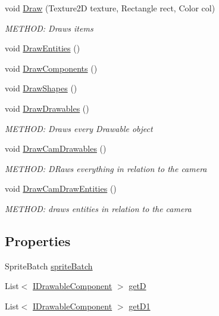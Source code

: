 \begin{DoxyCompactItemize}
void \hyperlink{a00526_a5e7f7ef9bf468db27267ee1e50a34af3}{Draw} (Texture2D texture, Rectangle rect, Color col)
\begin{DoxyCompactList}\small\item\em M\+E\+T\+H\+OD\+: Draws items \end{DoxyCompactList}\item 
void \hyperlink{a00526_a9eb548f058744b031b639810a16ba40d}{Draw\+Entities} ()
\item 
void \hyperlink{a00526_a0df839a3a677b7595e4535716e823809}{Draw\+Components} ()
\item 
void \hyperlink{a00526_af81e4faf42327afbf604c3bb4d09499a}{Draw\+Shapes} ()
\item 
void \hyperlink{a00526_aa957794d6537025fb2535517bcc691cc}{Draw\+Drawables} ()
\begin{DoxyCompactList}\small\item\em M\+E\+T\+H\+OD\+: Draws every Drawable object \end{DoxyCompactList}\item 
void \hyperlink{a00526_adc520b6c317ed9e0d4e51fd34c22c511}{Draw\+Cam\+Drawables} ()
\begin{DoxyCompactList}\small\item\em M\+E\+T\+H\+OD\+: D\+Raws everything in relation to the camera \end{DoxyCompactList}\item 
void \hyperlink{a00526_a96510018c93924e8d5456891b28b51bb}{Draw\+Cam\+Draw\+Entities} ()
\begin{DoxyCompactList}\small\item\em M\+E\+T\+H\+OD\+: draws entities in relation to the camera \end{DoxyCompactList}\end{DoxyCompactItemize}
\subsection*{Properties}
\begin{DoxyCompactItemize}
\item 
Sprite\+Batch \hyperlink{a00526_afd06d1ef067613ca63fe1302c4c41e3d}{sprite\+Batch}
\item 
List$<$ \hyperlink{a00454}{I\+Drawable\+Component} $>$ \hyperlink{a00526_a954e0be8a74a97fd978b65edba1c0223}{getD}
\item 
List$<$ \hyperlink{a00454}{I\+Drawable\+Component} $>$ \hyperlink{a00526_afb8e15ee3c1d4f62a0ed4b60f433199e}{get\+D1}
\end{DoxyCompactItemize}


